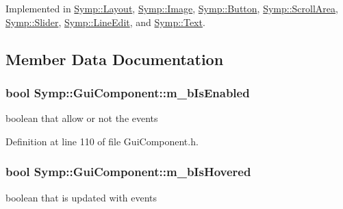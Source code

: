 Implemented in \hyperlink{class_symp_1_1_layout_a34a3df4f1637d1a95015e19a1ecf7fb4}{Symp\-::\-Layout}, \hyperlink{class_symp_1_1_image_a8de69cca37efc613094cfd1311ea1e13}{Symp\-::\-Image}, \hyperlink{class_symp_1_1_button_a5cec3a7ede8af0c059d6430f971b276b}{Symp\-::\-Button}, \hyperlink{class_symp_1_1_scroll_area_a9183e9193ecfa8a2d9fda6ff4d706680}{Symp\-::\-Scroll\-Area}, \hyperlink{class_symp_1_1_slider_ab010de4ff23eef8a6cc6706e9902209f}{Symp\-::\-Slider}, \hyperlink{class_symp_1_1_line_edit_a7742de762d2f74e87050ee4086aec9ae}{Symp\-::\-Line\-Edit}, and \hyperlink{class_symp_1_1_text_ab11eff488943981a0009549b77249a46}{Symp\-::\-Text}.



\subsection{Member Data Documentation}
\hypertarget{class_symp_1_1_gui_component_af7a55b2a7e2f3e11c30a51f32571564f}{
\subsubsection[{m\-\_\-b\-Is\-Enabled}]{\setlength{\rightskip}{0pt plus 5cm}bool Symp\-::\-Gui\-Component\-::m\-\_\-b\-Is\-Enabled\hspace{0.3cm}{\ttfamily [protected]}}}\label{class_symp_1_1_gui_component_af7a55b2a7e2f3e11c30a51f32571564f}
boolean that allow or not the events 

Definition at line 110 of file Gui\-Component.\-h.

\hypertarget{class_symp_1_1_gui_component_abb0e57a2b738621ed7e4aa89bf65e44e}{
\subsubsection[{m\-\_\-b\-Is\-Hovered}]{\setlength{\rightskip}{0pt plus 5cm}bool Symp\-::\-Gui\-Component\-::m\-\_\-b\-Is\-Hovered\hspace{0.3cm}{\ttfamily [protected]}}}\label{class_symp_1_1_gui_component_abb0e57a2b738621ed7e4aa89bf65e44e}
boolean that is updated with events 

